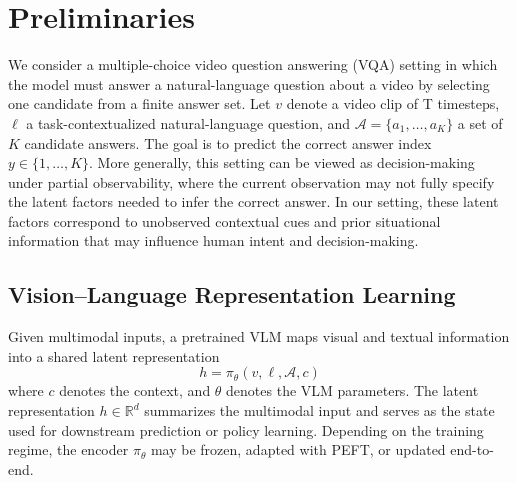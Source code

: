 \documentclass[letterpaper, 10 pt, conference]{ieeeconf}  %
\newcommand{\EditSS}[1]{{\color{black} #1}}
\begin{document}




\EditSS{\section{Preliminaries}

We consider a multiple-choice video question answering (VQA) setting in which the model must answer a natural-language question about a video by selecting one candidate from a finite answer set. Let $v$ denote a video clip of T timesteps, $\ell$ a task-contextualized natural-language question, and $\mathcal{A}=\{a_1,\dots,a_K\}$ a set of $K$ candidate answers. The goal is to predict the correct answer index $y \in \{1,\dots,K\}$. More generally, this setting can be viewed as decision-making under partial observability, where the current observation may not fully specify the latent factors needed to infer the correct answer. In our setting, these latent factors correspond to unobserved contextual cues and prior situational information that may influence human intent and decision-making.


\subsection{Vision--Language Representation Learning}

Given multimodal inputs, a pretrained VLM maps visual and textual information into a shared latent representation 
\begin{equation}
h = \pi_{\theta}(v, \ell, \mathcal{A}, c)
\end{equation}
where $c$ denotes the context, and $\theta$ denotes the VLM parameters. The latent representation $h \in \mathbb{R}^{d}$ summarizes the multimodal input and serves as the state used for downstream prediction or policy learning. Depending on the training regime, the encoder $\pi_{\theta}$ may be frozen, adapted with PEFT, or updated end-to-end.

}
\end{document}
